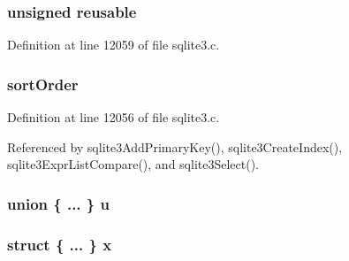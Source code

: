 \hypertarget{struct_expr_list_1_1_expr_list__item_a60d9718cc6bd5984391c8bb60f7591bc}{}
\subsubsection[{reusable}]{\setlength{\rightskip}{0pt plus 5cm}unsigned reusable}\label{struct_expr_list_1_1_expr_list__item_a60d9718cc6bd5984391c8bb60f7591bc}


Definition at line 12059 of file sqlite3.\+c.

\hypertarget{struct_expr_list_1_1_expr_list__item_adc5b0d7a9f6be9946f07ce7eb4d00cb5}{}
\subsubsection[{sort\+Order}]{ sort\+Order}\label{struct_expr_list_1_1_expr_list__item_adc5b0d7a9f6be9946f07ce7eb4d00cb5}


Definition at line 12056 of file sqlite3.\+c.



Referenced by sqlite3\+Add\+Primary\+Key(), sqlite3\+Create\+Index(), sqlite3\+Expr\+List\+Compare(), and sqlite3\+Select().

\hypertarget{struct_expr_list_1_1_expr_list__item_a1babb69a3d2e0768726db1a48ed7e25b}{}
\subsubsection[{u}]{\setlength{\rightskip}{0pt plus 5cm}union \{ ... \}   u}\label{struct_expr_list_1_1_expr_list__item_a1babb69a3d2e0768726db1a48ed7e25b}
\hypertarget{struct_expr_list_1_1_expr_list__item_a4b5438b50d2670a588b03fd443733a36}{}
\subsubsection[{x}]{\setlength{\rightskip}{0pt plus 5cm}struct \{ ... \}   x}\label{struct_expr_list_1_1_expr_list__item_a4b5438b50d2670a588b03fd443733a36}
\hypertarget{struct_expr_list_1_1_expr_list__item_a661118d86ac4127d40bf3be78d92117d}{}
